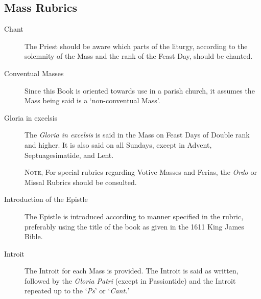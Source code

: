 \subsection{Mass Rubrics}
\begin{description}
    \item[Chant] The Priest should be aware which parts of the liturgy, according to the solemnity of the Mass and the rank of the Feast Day, should be chanted.
    \item[Conventual Masses] %
    Since this Book is oriented towards use in a parish church, it assumes the Mass being said is a `non-conventual Mass'.
    \item[Gloria in excelsis] The \emph{Gloria in excelsis} is said in the Mass on Feast Days of Double rank and higher. It is also said on all Sundays, except in Advent, Septuagesimatide, and Lent.\par
    \textsc{Note,} For special rubrics regarding Votive Masses and Ferias, the \emph{Ordo} or Missal Rubrics should be consulted.
    \item[Introduction of the Epistle] The Epistle is introduced according to manner specified in the rubric, preferably using the title of the book as given in the 1611 King James Bible.
    \item[Introit] The Introit for each Mass is provided. The Introit is said as written, followed by the \emph{Gloria Patri} (except in Passiontide) and the Introit repeated up to the `\emph{Ps}' or `\emph{Cant.}'

\end{description}
